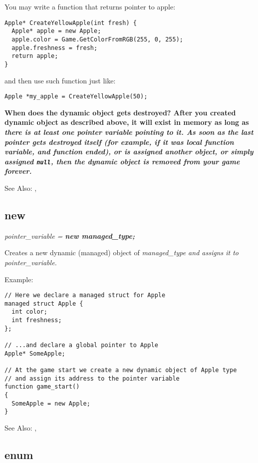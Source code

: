 You may write a function that returns pointer to apple:

\begin{verbatim}
Apple* CreateYellowApple(int fresh) {
  Apple* apple = new Apple;
  apple.color = Game.GetColorFromRGB(255, 0, 255);
  apple.freshness = fresh;
  return apple;
}
\end{verbatim}

and then use such function just like:

\begin{verbatim}
Apple *my_apple = CreateYellowApple(50);
\end{verbatim}


\bf{When does the dynamic object gets destroyed?}
After you created dynamic object as described above, it will exist in memory as long as
\it{there is at least one pointer variable pointing to it}. As soon as the last pointer
gets destroyed itself (for example, if it was local function variable, and function ended),
or is assigned another object, or simply assigned \verb$null$, then the dynamic object is
removed from your game forever.

See Also: ,


\subsection{new}\label{newstatement}%

\it{pointer_variable} = \bf{new} \it{managed_type};

Creates a new dynamic (managed) object of \it{managed_type} and assigns it to \it{pointer_variable}.

Example:

\begin{verbatim}
// Here we declare a managed struct for Apple
managed struct Apple {
  int color;
  int freshness;
};

// ...and declare a global pointer to Apple
Apple* SomeApple;

// At the game start we create a new dynamic object of Apple type
// and assign its address to the pointer variable
function game_start()
{
  SomeApple = new Apple;
}
\end{verbatim}

See Also: ,


\subsection{enum}\label{enum}%

